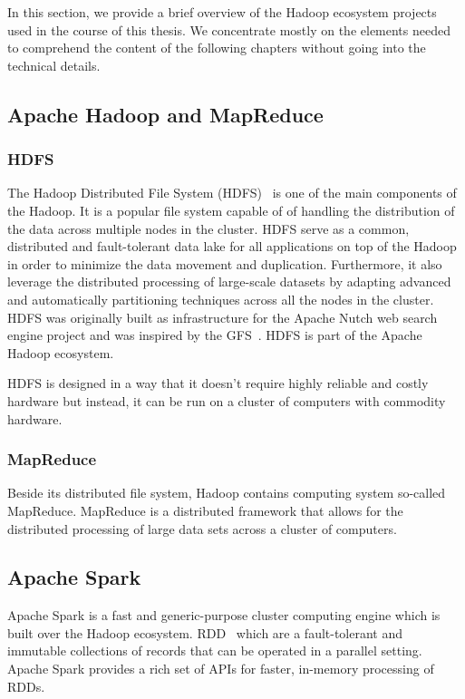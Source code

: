 In this section, we provide a brief overview of the Hadoop ecosystem projects used in the course of this thesis.
We concentrate mostly on the elements needed to comprehend the content of the following chapters without going into the technical details.

\subsection{Apache Hadoop and MapReduce}

\subsubsection{HDFS}
The Hadoop Distributed File System (\gls{HDFS})~\cite{Shvachko:2010:HDF:1913798.1914427} is one of the main components of the Hadoop. 
It is a popular file system capable of of handling the distribution of the data across multiple nodes in the cluster.
HDFS serve as a common, distributed and fault-tolerant data lake for all applications on top of the Hadoop in order to minimize the data movement and duplication.
Furthermore, it also leverage the distributed processing of large-scale datasets by adapting advanced and automatically partitioning techniques across all the nodes in the cluster.
\gls{HDFS} was originally built as infrastructure for the Apache Nutch web search engine project and was inspired by the \gls{GFS}~\cite{Ghemawat:2003:GFS:945445.945450}. 
\gls{HDFS} is part of the Apache Hadoop ecosystem.

\gls{HDFS} is designed in a way that it doesn't require highly reliable and costly hardware but instead, it can be run on a cluster of computers with commodity hardware.



\subsubsection{MapReduce}
Beside its distributed file system, Hadoop contains computing system so-called MapReduce.
MapReduce is a distributed framework that allows for the distributed processing of large data sets across a cluster of computers.  


\subsection{Apache Spark}
Apache Spark is a fast and generic-purpose cluster computing engine which is built over the Hadoop ecosystem.
\gls{RDD}~\cite{zaharia2012resilient} which are a fault-tolerant and immutable collections of records that can be operated in a parallel setting.
Apache Spark provides a rich set of APIs for faster, in-memory processing of RDDs. 